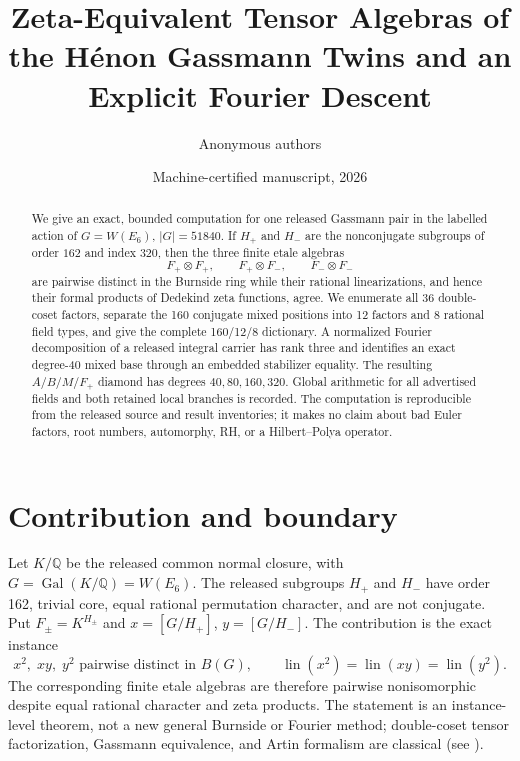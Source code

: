 \documentclass[11pt]{article}
\title{Zeta-Equivalent Tensor Algebras of the Hénon Gassmann Twins and an Explicit Fourier Descent}
\author{Anonymous authors}
\date{Machine-certified manuscript, 2026}
\newcommand{\Q}{\mathbb Q}
\newcommand{\Gal}{\operatorname{Gal}}
\begin{document}
\maketitle

\begin{abstract}
We give an exact, bounded computation for one released Gassmann pair in the labelled action of
$G=W(E_6)$, $|G|=51840$.  If $H_+$ and $H_-$ are the nonconjugate subgroups of order $162$
and index $320$, then the three finite etale algebras
\[
 F_+\otimes F_+,\qquad F_+\otimes F_-,\qquad F_-\otimes F_-
\]
are pairwise distinct in the Burnside ring while their rational linearizations, and hence their
formal products of Dedekind zeta functions, agree.  We enumerate all 36 double-coset factors,
separate the 160 conjugate mixed positions into 12 factors and 8 rational field types, and give
the complete 160/12/8 dictionary.  A normalized Fourier decomposition of a released integral
carrier has rank three and identifies an exact degree-40 mixed base through an embedded stabilizer
equality.  The resulting $A/B/M/F_+$ diamond has degrees $40,80,160,320$.  Global arithmetic
for all advertised fields and both retained local branches is recorded.  The computation is
reproducible from the released source and result inventories; it makes no claim about bad Euler
factors, root numbers, automorphy, RH, or a Hilbert--Polya operator.
\end{abstract}

\section{Contribution and boundary}
Let $K/\Q$ be the released common normal closure, with $G=\Gal(K/\Q)=W(E_6)$.  The released
subgroups $H_+$ and $H_-$ have order 162, trivial core, equal rational permutation character,
and are not conjugate.  Put $F_\pm=K^{H_\pm}$ and $x=[G/H_+]$, $y=[G/H_-]$.
The contribution is the exact instance
\begin{equation}
 x^2,\;xy,\;y^2\text{ pairwise distinct in }B(G),\qquad
 \operatorname{lin}(x^2)=\operatorname{lin}(xy)=\operatorname{lin}(y^2).
\label{eq:main}
\end{equation}
The corresponding finite etale algebras are therefore pairwise nonisomorphic despite equal
rational character and zeta products.  The statement is an instance-level theorem, not a new
general Burnside or Fourier method; double-coset tensor factorization, Gassmann equivalence,
and Artin formalism are classical (see \cite{james,perlis,bartel}).
\end{document}

